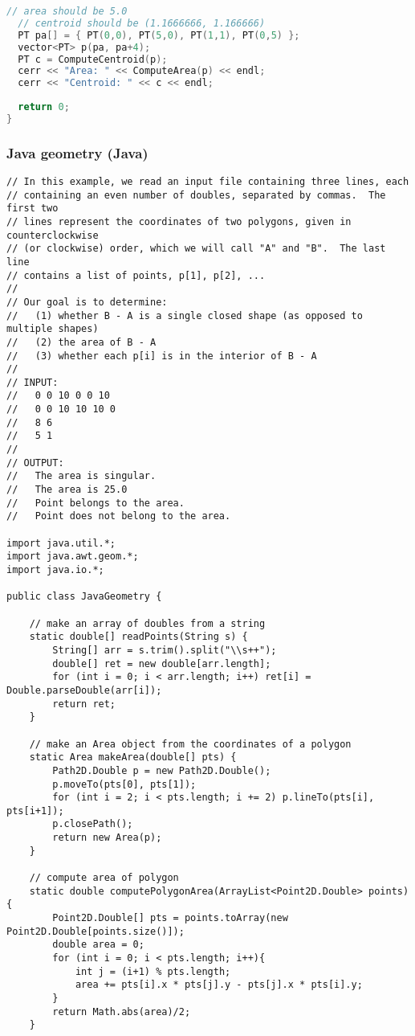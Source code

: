 \begin{lstlisting}[language=C++]
  // area should be 5.0
  // centroid should be (1.1666666, 1.166666)
  PT pa[] = { PT(0,0), PT(5,0), PT(1,1), PT(0,5) };
  vector<PT> p(pa, pa+4);
  PT c = ComputeCentroid(p);
  cerr << "Area: " << ComputeArea(p) << endl;
  cerr << "Centroid: " << c << endl;
  
  return 0;
}
\end{lstlisting}
\subsubsection{Java geometry (Java)}
\begin{lstlisting}
// In this example, we read an input file containing three lines, each
// containing an even number of doubles, separated by commas.  The first two
// lines represent the coordinates of two polygons, given in counterclockwise 
// (or clockwise) order, which we will call "A" and "B".  The last line 
// contains a list of points, p[1], p[2], ...
//
// Our goal is to determine:
//   (1) whether B - A is a single closed shape (as opposed to multiple shapes)
//   (2) the area of B - A
//   (3) whether each p[i] is in the interior of B - A
//
// INPUT:
//   0 0 10 0 0 10
//   0 0 10 10 10 0
//   8 6
//   5 1
//
// OUTPUT:
//   The area is singular.
//   The area is 25.0
//   Point belongs to the area.
//   Point does not belong to the area.

import java.util.*;
import java.awt.geom.*;
import java.io.*;

public class JavaGeometry {

    // make an array of doubles from a string
    static double[] readPoints(String s) {
        String[] arr = s.trim().split("\\s++");
        double[] ret = new double[arr.length];
        for (int i = 0; i < arr.length; i++) ret[i] = Double.parseDouble(arr[i]);
        return ret;
    }

    // make an Area object from the coordinates of a polygon
    static Area makeArea(double[] pts) {
        Path2D.Double p = new Path2D.Double();
        p.moveTo(pts[0], pts[1]);
        for (int i = 2; i < pts.length; i += 2) p.lineTo(pts[i], pts[i+1]);
        p.closePath();
        return new Area(p);        
    }

    // compute area of polygon
    static double computePolygonArea(ArrayList<Point2D.Double> points) {
        Point2D.Double[] pts = points.toArray(new Point2D.Double[points.size()]);  
        double area = 0;
        for (int i = 0; i < pts.length; i++){
            int j = (i+1) % pts.length;
            area += pts[i].x * pts[j].y - pts[j].x * pts[i].y;
        }        
        return Math.abs(area)/2;
    }


\end{lstlisting}
